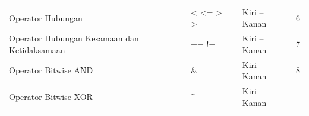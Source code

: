 \begin{longtable}[]{@{}llll@{}}
\begin{minipage}[t]{0.52\columnwidth}
Operator Hubungan
\strut\end{minipage} &
\begin{minipage}[t]{0.17\columnwidth}\raggedright\strut
\textless{} \textless{}= \textgreater{} \textgreater{}=
\strut\end{minipage} &
\begin{minipage}[t]{0.14\columnwidth}\raggedright\strut
Kiri -- Kanan
\strut\end{minipage} &
\begin{minipage}[t]{0.05\columnwidth}\raggedright\strut
6
\strut\end{minipage}\tabularnewline
\begin{minipage}[t]{0.52\columnwidth}\raggedright\strut
Operator Hubungan Kesamaan dan Ketidaksamaan
\strut\end{minipage} &
\begin{minipage}[t]{0.17\columnwidth}\raggedright\strut
== !=
\strut\end{minipage} &
\begin{minipage}[t]{0.14\columnwidth}\raggedright\strut
Kiri -- Kanan
\strut\end{minipage} &
\begin{minipage}[t]{0.05\columnwidth}\raggedright\strut
7
\strut\end{minipage}\tabularnewline
\begin{minipage}[t]{0.52\columnwidth}\raggedright\strut
Operator Bitwise AND
\strut\end{minipage} &
\begin{minipage}[t]{0.17\columnwidth}\raggedright\strut
\&
\strut\end{minipage} &
\begin{minipage}[t]{0.14\columnwidth}\raggedright\strut
Kiri -- Kanan
\strut\end{minipage} &
\begin{minipage}[t]{0.05\columnwidth}\raggedright\strut
8
\strut\end{minipage}\tabularnewline
\begin{minipage}[t]{0.52\columnwidth}\raggedright\strut
Operator Bitwise XOR
\strut\end{minipage} &
\begin{minipage}[t]{0.17\columnwidth}\raggedright\strut
\^{}
\strut\end{minipage} &
\begin{minipage}[t]{0.14\columnwidth}\raggedright\strut
Kiri -- Kanan
\strut\end{minipage} &
\begin{minipage}[t]{0.05\columnwidth}\raggedright\strut

\end{minipage}
\end{longtable}
